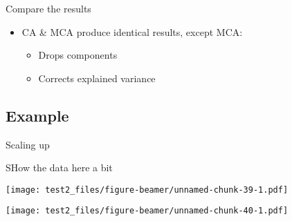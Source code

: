 \documentclass[
  ignorenonframetext,
]{beamer}
\providecommand{\tightlist}{%
  \setlength{\itemsep}{0pt}\setlength{\parskip}{0pt}}
\begin{document}
\begin{frame}{Compare the results}
\protect\hypertarget{compare-the-results}{}

\begin{table}[H]
\centering
{}
\end{table}

\begin{itemize}[<+->]
\tightlist
\item
  CA \& MCA produce identical results, except MCA:

  \begin{itemize}[<+->]
  \tightlist
  \item
    Drops components
  \item
    Corrects explained variance
  \end{itemize}
\end{itemize}

\end{frame}

\hypertarget{example-1}{%
\subsection{Example}\label{example-1}}

\begin{frame}{Scaling up}
\protect\hypertarget{scaling-up-1}{}

SHow the data here a bit

\end{frame}

\begin{frame}

\texttt{[image: test2\_files/figure-beamer/unnamed-chunk-39-1.pdf]}

\end{frame}

\begin{frame}

\texttt{[image: test2\_files/figure-beamer/unnamed-chunk-40-1.pdf]}

\end{frame}
\end{document}
